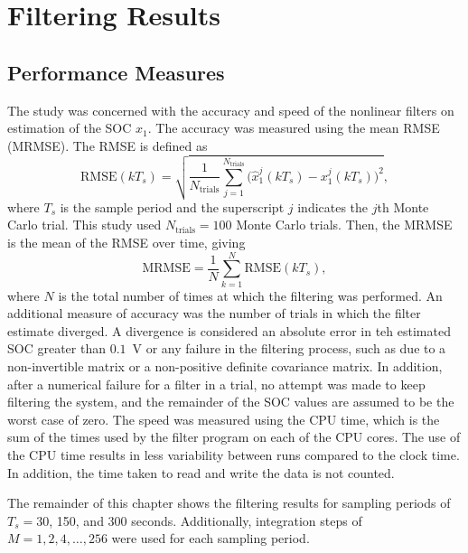 \documentclass[../zhang_thesis.tex]{subfiles}
\begin{document}
\chapter{Filtering Results}


\section{Performance Measures}

The study was concerned with the accuracy and speed of the nonlinear filters on estimation of the SOC $x_1$. The accuracy was measured using the mean RMSE (MRMSE). The RMSE is defined as
\begin{equation}
    \mathrm{RMSE}(kT_s) = \sqrt{ \frac{1}{N_\text{trials}} \sum_{j=1}^{N_\text{trials}} \Big( \hat{x}_1^j(kT_s) - x_1^j(kT_s) \Big)^2 },
\end{equation}
where $T_s$ is the sample period and the superscript $j$ indicates the $j$th Monte Carlo trial. This study used $N_\text{trials}=100$ Monte Carlo trials. Then, the MRMSE is the mean of the RMSE over time, giving
\begin{equation}
    \mathrm{MRMSE} = \frac{1}{N} \sum_{k=1}^N \mathrm{RMSE}(kT_s),
\end{equation}
where $N$ is the total number of times at which the filtering was performed. An additional measure of accuracy was the number of trials in which the filter estimate diverged. A divergence is considered an absolute error in teh estimated SOC greater than $0.1$~V or any failure in the filtering process, such as due to a non-invertible matrix or a non-positive definite covariance matrix. In addition, after a numerical failure for a filter in a trial, no attempt was made to keep filtering the
system, and the remainder of the SOC values are assumed to be the worst case of zero. The speed was measured using the CPU time, which is the sum of the times used by the filter program on each of the CPU cores. The use of the CPU time results in less variability between runs compared to the clock time. In addition, the time taken to read and write the data is not counted.

The remainder of this chapter shows the filtering results for sampling periods of $T_s=30$, 150, and 300 seconds. Additionally, integration steps of $M=1,2,4,\dots,256$ were used for each sampling period.

\clearpage
\end{document}
